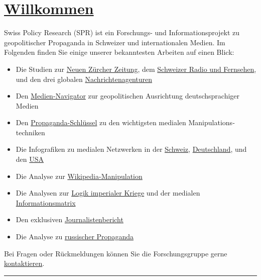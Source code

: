 \hypertarget{willkommen}{%
\section{\texorpdfstring{\href{https://swprs.org/2018/10/09/willkommen/}{Willkommen}}{Willkommen}}\label{willkommen}}

Swiss Policy Research (SPR) ist ein Forschungs- und Informationsprojekt
zu geopolitischer Propaganda in Schweizer und internationalen Medien. Im
Folgenden finden Sie einige unserer bekanntesten Arbeiten auf einen
Blick:

\begin{itemize}
\tightlist
\item
  Die Studien zur \href{https://swprs.org/die-nzz-studie/}{Neuen Zürcher
  Zeitung}, dem
  \href{https://swprs.org/srf-propaganda-analyse/}{Schweizer Radio und
  Fernsehen}, und den drei globalen
  \href{https://swprs.org/der-propaganda-multiplikator/}{Nachrichtenagenturen}
\item
  Den \href{https://swprs.org/medien-navigator/}{Medien-Navigator} zur
  geopolitischen Ausrichtung deutschsprachiger Medien
\item
  Den
  \href{https://swprs.org/der-propaganda-schluessel/}{Propaganda-Schlüssel}
  zu den wich­tig­sten medialen Manipulations­techniken
\item
  Die Infografiken zu medialen Netzwerken in der
  \href{https://swprs.org/netzwerk-medien-schweiz/}{Schweiz},
  \href{https://swprs.org/netzwerk-medien-deutschland/}{Deutschland},
  und den
  \href{https://swprs.org/das-american-empire-und-seine-medien/}{USA}
\item
  Die Analyse zur
  \href{https://swprs.org/propaganda-in-der-wikipedia/}{Wikipedia-Manipulation}
\item
  Die Analysen zur
  \href{https://swprs.org/logik-imperialer-kriege/}{Logik imperialer
  Kriege} und der medialen
  \href{https://swprs.org/die-propaganda-matrix/}{Informationsmatrix}
\item
  Den exklusiven
  \href{https://swprs.org/bericht-eines-journalisten/}{Journalistenbericht}
\item
  Die Analyse zu
  \href{https://swprs.org/russische-propaganda/}{russischer Propaganda}
\end{itemize}

Bei Fragen oder Rückmeldungen können Sie die Forschungsgruppe gerne
\href{https://swprs.org/kontakt/}{kontaktieren}.

\begin{center}\rule{0.5\linewidth}{\linethickness}\end{center}

